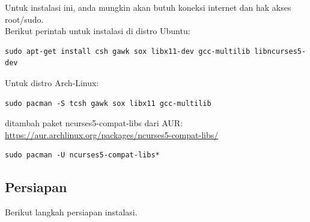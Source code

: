 \documentclass[12pt,]{article}
\begin{document}
	Untuk instalasi ini, anda mungkin akan butuh koneksi internet dan hak akses root/sudo. \\
	
	Berikut perintah untuk instalasi di distro Ubuntu:
	\begin{verbatim}
sudo apt-get install csh gawk sox libx11-dev gcc-multilib libncurses5-dev
	\end{verbatim}
	
	Untuk distro Arch-Linux:
	\begin{verbatim}
sudo pacman -S tcsh gawk sox libx11 gcc-multilib 
	\end{verbatim}
	
	ditambah paket ncurses5-compat-libs dari AUR:\\
	\url{https://aur.archlinux.org/packages/ncurses5-compat-libs/}
	
	\begin{verbatim}
sudo pacman -U ncurses5-compat-libs*
	\end{verbatim}
	
	\newpage
	\subsection{Persiapan}
	
	Berikut langkah persiapan instalasi.
	
\end{document}
